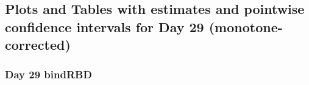 \documentclass[]{article}
\begin{document}
\clearpage
\clearpage

\hypertarget{plots-and-tables-with-estimates-and-pointwise-confidence-intervals-for-day-29-monotone-corrected}{%
\subsection{Plots and Tables with estimates and pointwise confidence
intervals for Day 29
(monotone-corrected)}\label{plots-and-tables-with-estimates-and-pointwise-confidence-intervals-for-day-29-monotone-corrected}}

\clearpage

\hypertarget{day-29-bindrbd-1}{%
\subsubsection{Day 29 bindRBD}\label{day-29-bindrbd-1}}
\end{document}
